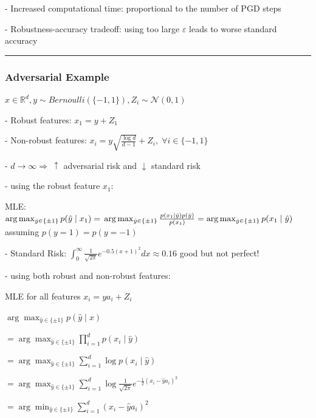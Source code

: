 - Increased computational time: proportional to the number of PGD steps

- Robustness-accuracy tradeoff: using too large $\varepsilon$ leads to worse standard accuracy

\vspace{4pt}
\hrule
\vspace{4pt}
\subsubsection{Adversarial Example}

$x\in\mathbb{R}^{d},y\sim{{Bernoulli}}(\{-1,1\}),Z_{i}\sim{\mathcal{N}}(0,1)$

- Robust features: $x_{1}=y+Z_{1}$

- Non-robust features: $x_{i}=y{\sqrt{\frac{\log d}{d-1}}}+Z_{i}, \; \forall i \in \{-1, 1\}$

- $d\to\infty \Rightarrow \ \uparrow$ adversarial risk and $\downarrow$ standard risk 

- using the robust feature $x_1$:

MLE: $\arg\operatorname*{max}_{\hat{y}\in\{\pm1\}}p(\hat{y}\;\vert\;x_{1})
=\\\operatorname*{arg}\operatorname*{max}_{{\hat{y}}\in\{\pm1\}}{\frac{p(x_{1}\mid{\hat{y}})p({\hat{y}})}{p(x_{1})}}
=\operatorname*{arg}\operatorname*{max}_{{\hat{y}}\in\{\pm1\}}{p(x_{1}\mid{\hat{y}})}$ 
assuming $p(y=1)=p(y=-1)$

- Standard Risk: $\int_{0}^{\infty}{\frac{1}{\sqrt{2\pi}}}e^{-0.5(x+1)^{2}}d x\approx0.16$ good but not perfect!

- using both robust and non-robust features:

MLE for all features $x_{i}=y a_{i}+Z_{i}$

$\arg\operatorname*{max}_{{\hat{y}}\in\{\pm1\}}p({\hat{y}}\mid x)$

$=\arg\operatorname*{max}_{{\hat{y}}\in\{\pm1\}}\prod_{i=1}^{d}p(x_{i}\mid{\hat{y}})$

$=\arg\operatorname*{max}_{{\hat{y}}\in\{\pm1\}}\sum_{i=1}^{d}\log p(x_{i}\mid{\hat{y}})$

$=\arg\operatorname*{max}_{{\hat{y}}\in\{\pm1\}}\sum_{i=1}^{d}\log \frac{1}{\sqrt{2\pi}}e^{-\frac{1}{2}(x_{i}-\hat{y}a_{i})^{2}}$

$=\arg\operatorname*{min}_{{\hat{y}}\in\{\pm1\}}\sum_{i=1}^{d}(x_{i}-\hat{y}a_{i})^{2}$

